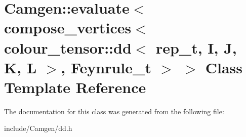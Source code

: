 \hypertarget{a00167}{}\section{Camgen\+:\+:evaluate$<$ compose\+\_\+vertices$<$ colour\+\_\+tensor\+:\+:dd$<$ rep\+\_\+t, I, J, K, L $>$, Feynrule\+\_\+t $>$ $>$ Class Template Reference}
\label{a00167}


The documentation for this class was generated from the following file\+:\begin{DoxyCompactItemize}
\item 
include/\+Camgen/dd.\+h\end{DoxyCompactItemize}
